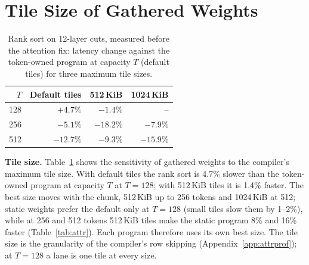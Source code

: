 \section{Tile Size of Gathered Weights}
\label{app:tiles}

\begin{table}[H]
\caption{Rank sort on 12-layer cuts, measured before the attention fix: latency change against the token-owned program
at capacity $T$ (default tiles) for three maximum tile sizes.}
\label{tab:tiles}
\vskip 0.1in
\begin{center}
\begin{small}
\begin{tabular}{@{}rrrr@{}}
\toprule
$T$ & Default tiles & 512\,KiB & 1024\,KiB \\
\midrule
128 & $+4.7\%$ & $\mathbf{-1.4\%}$ & -- \\
256 & $-5.1\%$ & $\mathbf{-18.2\%}$ & $-7.9\%$ \\
512 & $-12.7\%$ & $-9.3\%$ & $\mathbf{-15.9\%}$ \\
\bottomrule
\end{tabular}
\end{small}
\end{center}
\vskip -0.15in
\end{table}

\textbf{Tile size.} Table~\ref{tab:tiles} shows the sensitivity of gathered weights to the compiler's maximum tile size.
With default tiles the rank sort is 4.7\% slower than the token-owned program at capacity $T$ at $T=128$; with 512\,KiB
tiles it is 1.4\% faster. The
best size moves with the chunk, 512\,KiB up to 256 tokens and 1024\,KiB at 512; static weights prefer the default only
at $T=128$ (small tiles slow them by 1--2\%), while at 256 and 512 tokens 512\,KiB tiles make the static program 8\% and 16\%
faster (Table~\ref{tab:attr}). Each program therefore uses its own best size. The tile size is the granularity of the
compiler's row skipping (Appendix~\ref{app:attrprof}); at $T=128$ a lane is one tile at every size.
